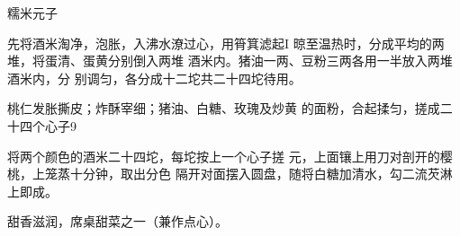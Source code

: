 \begin{recipe}[原珍珠元子]{糯米元子}

\ingredients


\cooking

\step 先将酒米淘净，泡胀，入沸水潦过心，用筲箕滤起I 晾至温热时，分成平均的两堆，将蛋清、蛋黄分别倒入两堆 酒米内。猪油一两、豆粉三两各用一半放入两堆酒米内，分 别调匀，各分成十二坨共二十四坨待用。

\step 桃仁发胀撕皮；炸酥宰细；猪油、白糖、玫瑰及炒黄 的面粉，合起揉匀，搓成二十四个心子9

\step 将两个颜色的酒米二十四坨，每坨按上一个心子搓 元，上面镶上用刀对剖开的樱桃，上笼蒸十分钟，取出分色 隔开对面摆入圆盘，随将白糖加清水，勾二流芡淋上即成。

\notes

甜香滋润，席桌甜菜之一（兼作点心）。

\end{recipe}

